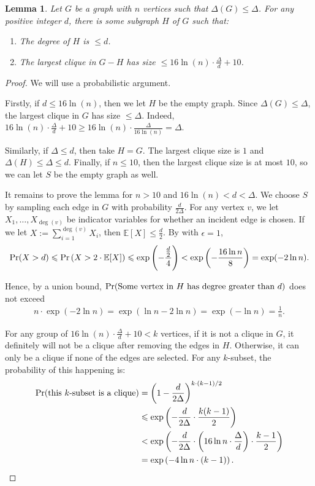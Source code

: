\documentclass[11pt]{article}
\newtheorem{lemma}{Lemma}[section]
\theoremstyle{definition}
\renewcommand{\leq}{\leqslant}
\renewcommand{\geq}{\geqslant}
\renewcommand{\le}{\leq}
\renewcommand{\ge}{\geq}
\DeclareMathOperator*{\Prob}{\ensuremath{\textnormal{Pr}}}
\renewcommand{\Pr}{\Prob}
\begin{document}
\begin{lemma}\label{clique-removal}
Let $G$ be a graph with $n$ vertices such that $\Delta{(G)}\le \Delta$. For any positive integer $d$, there is some subgraph $H$ of $G$ such that:
\begin{enumerate}
    \item\label{S-degree} The degree of $H$ is $\le d$.
    \item\label{clique-size} The largest clique in $G-H$ has size $\le 16\ln(n)\cdot \frac {\Delta}d + 10$.
\end{enumerate}
\end{lemma}
\begin{proof}
    We will use a probabilistic argument.
    
    Firstly, if $d\le 16\ln (n)$, then we let $H$ be the empty graph. Since $\Delta{(G)}\le \Delta$, the largest clique in $G$ has size $\le \Delta$. Indeed, $16\ln (n)\cdot \frac {\Delta}d+10\ge 16\ln(n)\cdot \frac \Delta{16\ln(n)}=\Delta$. 

    Similarly, if $\Delta\le d$, then take $H=G$. The largest clique size is $1$ and $\Delta{(H)}\le \Delta\le d$. Finally, if $n\le 10$, then the largest clique size is at most $10$, so we can let $S$ be the empty graph as well. 
    
    It remains to prove the lemma for $n>10$ and $16\ln(n)<d<\Delta$. We choose $S$ by sampling each edge in $G$ with probability $\frac {d}{2\Delta}$. For any vertex $v$, we let $X_1,\dots,X_{\deg{(v)}}$ be indicator variables for whether an incident edge is chosen. If we let $X:=\sum_{i=1}^{\deg{(v)}} X_i$, then $\mathbb{E}[X]\le \frac {d}2$. By  with $\epsilon=1$, 
    \begin{align*}
        \Pr(X>d)\le \Pr\left(X>2\cdot\mathbb{E}[X]\right)\le\exp\left(-\frac{\frac{d}{2}}{4}\right)<\exp\left(-\frac {16\ln n}{8}\right) =\exp(-2\ln n).
    \end{align*}

    Hence, by a union bound, $\Pr(\text{Some vertex in $H$ has degree greater than $d$})$ does not exceed
    \begin{align*}
        n\cdot \exp\left(-2\ln n\right)=\exp(\ln n-2\ln n)=\exp (-\ln n)=\frac 1n.
    \end{align*}
    
    For any group of $16\ln(n)\cdot \frac {\Delta}d+10<k$ vertices, if it is not a clique in $G$, it definitely will not be a clique after removing the edges in $H$. Otherwise, it can only be a clique if none of the edges are selected. For any $k$-subset, the probability of this happening is:
    \begin{align*}
        \Pr(\text{this $k$-subset is a clique})&={\left(1-\frac {d}{2\Delta}\right)}^{k\cdot(k-1)/2}\\
        &\le\exp\left(-\frac d{2\Delta}\cdot \frac{k(k-1)}2\right)\\
        &<\exp\left(-\frac{d}{2\Delta}\cdot \left(16\ln n\cdot \frac {\Delta}d\right)\cdot \frac{k-1}2\right)\\
        &=\exp\left(-4\ln n\cdot (k-1)\right).
    \end{align*}


\end{proof}
\end{document}
